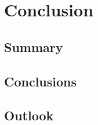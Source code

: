 \newpage
\section{Conclusion}\label{conclusion}

\subsection{Summary}

\subsection{Conclusions}

\subsection{Outlook}